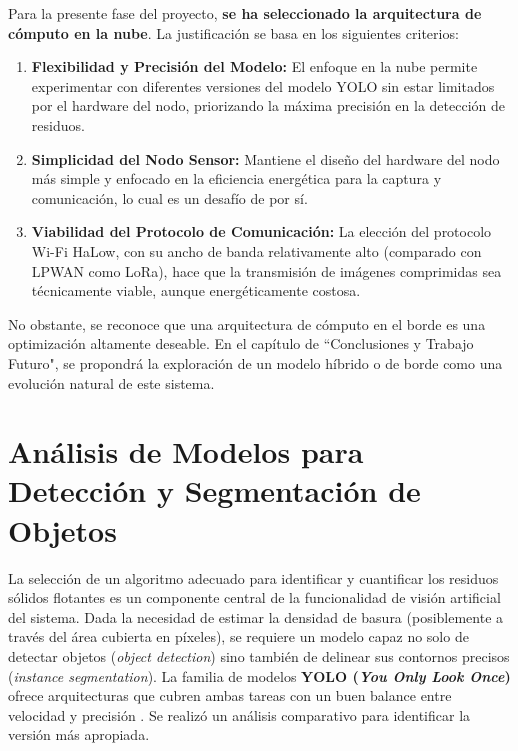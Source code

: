 Para la presente fase del proyecto, \textbf{se ha seleccionado la arquitectura de cómputo en la nube}. La justificación se basa en los siguientes criterios:

\begin{enumerate}
    \item \textbf{Flexibilidad y Precisión del Modelo:} El enfoque en la nube permite experimentar con diferentes versiones del modelo YOLO sin estar limitados por el hardware del nodo, priorizando la máxima precisión en la detección de residuos.
    \item \textbf{Simplicidad del Nodo Sensor:} Mantiene el diseño del hardware del nodo más simple y enfocado en la eficiencia energética para la captura y comunicación, lo cual es un desafío de por sí.
    \item \textbf{Viabilidad del Protocolo de Comunicación:} La elección del protocolo Wi-Fi HaLow, con su ancho de banda relativamente alto (comparado con LPWAN como LoRa), hace que la transmisión de imágenes comprimidas sea técnicamente viable, aunque energéticamente costosa.
\end{enumerate}

No obstante, se reconoce que una arquitectura de cómputo en el borde es una optimización altamente deseable. En el capítulo de ``Conclusiones y Trabajo Futuro", se propondrá la exploración de un modelo híbrido o de borde como una evolución natural de este sistema.




\section{Análisis de Modelos para Detección y Segmentación de Objetos}
\label{sec:analisis_vision}

La selección de un algoritmo adecuado para identificar y cuantificar los residuos sólidos flotantes es un componente central de la funcionalidad de visión artificial del sistema. Dada la necesidad de estimar la densidad de basura (posiblemente a través del área cubierta en píxeles), se requiere un modelo capaz no solo de detectar objetos (\textit{object detection}) sino también de delinear sus contornos precisos (\textit{instance segmentation}). La familia de modelos \textbf{YOLO (\textit{You Only Look Once})} ofrece arquitecturas que cubren ambas tareas con un buen balance entre velocidad y precisión \cite{sapkota2025yolo}. Se realizó un análisis comparativo para identificar la versión más apropiada.

